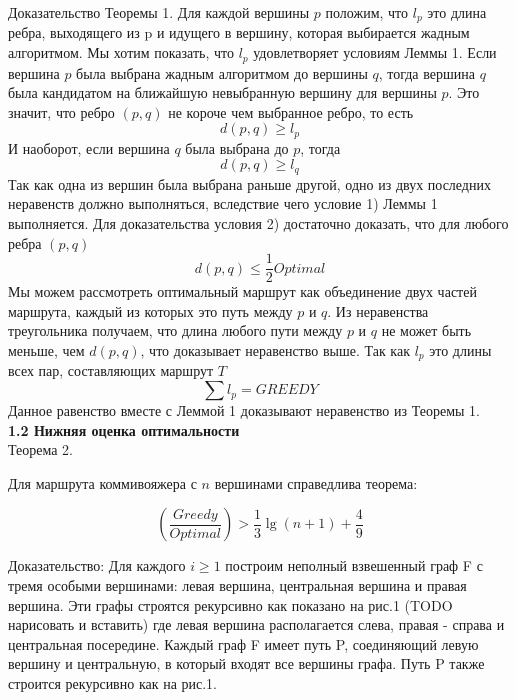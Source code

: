 \documentclass[a4paper, 14pt]{extarticle}
\begin{document}
Доказательство Теоремы 1. Для каждой  вершины $p$ положим, что $l_p$ это длина ребра, выходящего из p и идущего в вершину, которая выбирается жадным алгоритмом. Мы хотим показать, что $l_p$ удовлетворяет условиям Леммы 1. Если вершина $p$ была выбрана жадным алгоритмом до вершины $q$, тогда вершина $q$ была кандидатом на ближайшую невыбранную вершину для вершины $p$. Это значит, что ребро $(p,q)$ не короче чем выбранное ребро, то есть
\begin{equation}
d(p,q) \geq l_p
\end{equation}
И наоборот, если вершина $q$ была выбрана до $p$, тогда
\begin{equation}
d(p,q) \geq l_q
\end{equation}
Так как одна из вершин была выбрана раньше другой, одно из двух последних неравенств должно выполняться, вследствие чего  условие 1) Леммы 1 выполняется. Для доказательства условия 2) достаточно доказать, что для любого ребра $(p,q)$
\begin{equation}
d(p,q) \leq \frac{1}{2}Optimal
\end{equation}
Мы можем рассмотреть оптимальный маршрут как объединение двух частей маршрута, каждый из которых это путь между $p$ и $q$. Из неравенства треугольника получаем, что длина любого пути между $p$ и $q$ не может быть меньше, чем $d(p,q)$, что доказывает неравенство выше. Так как $l_p$ это длины всех пар, составляющих маршрут $T$
\begin{equation}
\sum l_p = GREEDY
\end{equation}
Данное равенство вместе с Леммой 1 доказывают неравенство из Теоремы 1.\\

\textbf{1.2 Нижняя оценка оптимальности}\\


Теорема 2.

Для маршрута коммивояжера с $n$ вершинами справедлива теорема:

\begin{equation}
	(\frac{Greedy}{Optimal}) > \frac{1}{3}{\lg (n+1)} + \frac{4}{9}
\end{equation}

Доказательство:  Для каждого $i \geq 1 $ построим неполный взвешенный граф F с тремя особыми вершинами: левая вершина, центральная вершина и правая вершина. Эти графы строятся рекурсивно как показано на рис.1 (TODO нарисовать и вставить) где левая вершина располагается слева, правая - справа и центральная посередине. Каждый граф F имеет путь P, соединяющий левую вершину и центральную, в который входят все вершины графа. Путь P также строится рекурсивно как на рис.1. 
\end{document}
